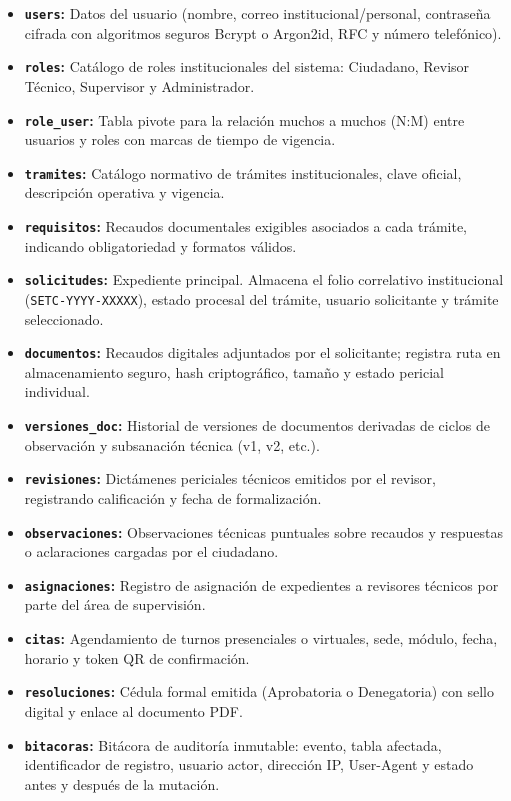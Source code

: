 \begin{itemize}
    \item \textbf{\texttt{users}:} Datos del usuario (nombre, correo institucional/personal, contraseña cifrada con algoritmos seguros Bcrypt o Argon2id, RFC y número telefónico).
    \item \textbf{\texttt{roles}:} Catálogo de roles institucionales del sistema: Ciudadano, Revisor Técnico, Supervisor y Administrador.
    \item \textbf{\texttt{role\_user}:} Tabla pivote para la relación muchos a muchos (N:M) entre usuarios y roles con marcas de tiempo de vigencia.
    \item \textbf{\texttt{tramites}:} Catálogo normativo de trámites institucionales, clave oficial, descripción operativa y vigencia.
    \item \textbf{\texttt{requisitos}:} Recaudos documentales exigibles asociados a cada trámite, indicando obligatoriedad y formatos válidos.
    \item \textbf{\texttt{solicitudes}:} Expediente principal. Almacena el folio correlativo institucional (\texttt{SETC-YYYY-XXXXX}), estado procesal del trámite, usuario solicitante y trámite seleccionado.
    \item \textbf{\texttt{documentos}:} Recaudos digitales adjuntados por el solicitante; registra ruta en almacenamiento seguro, hash criptográfico, tamaño y estado pericial individual.
    \item \textbf{\texttt{versiones\_doc}:} Historial de versiones de documentos derivadas de ciclos de observación y subsanación técnica (v1, v2, etc.).
    \item \textbf{\texttt{revisiones}:} Dictámenes periciales técnicos emitidos por el revisor, registrando calificación y fecha de formalización.
    \item \textbf{\texttt{observaciones}:} Observaciones técnicas puntuales sobre recaudos y respuestas o aclaraciones cargadas por el ciudadano.
    \item \textbf{\texttt{asignaciones}:} Registro de asignación de expedientes a revisores técnicos por parte del área de supervisión.
    \item \textbf{\texttt{citas}:} Agendamiento de turnos presenciales o virtuales, sede, módulo, fecha, horario y token QR de confirmación.
    \item \textbf{\texttt{resoluciones}:} Cédula formal emitida (Aprobatoria o Denegatoria) con sello digital y enlace al documento PDF.
    \item \textbf{\texttt{bitacoras}:} Bitácora de auditoría inmutable: evento, tabla afectada, identificador de registro, usuario actor, dirección IP, User-Agent y estado antes y después de la mutación.
\end{itemize}

